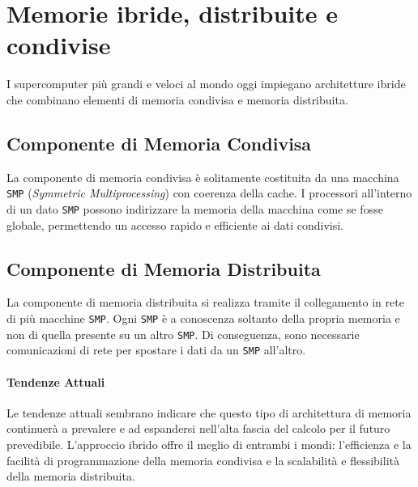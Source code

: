 \section{Memorie ibride, distribuite e condivise}

I supercomputer più grandi e veloci al mondo oggi impiegano architetture ibride che combinano elementi di memoria condivisa e memoria distribuita.

\subsection{Componente di Memoria Condivisa}
La componente di memoria condivisa è solitamente costituita da una macchina
\texttt{SMP} (\textit{Symmetric Multiprocessing}) con coerenza della cache.
I processori all'interno di un dato \texttt{SMP} possono indirizzare la memoria della
macchina come se fosse globale, permettendo un accesso rapido e efficiente ai
dati condivisi.

\subsection{Componente di Memoria Distribuita}
La componente di memoria distribuita si realizza tramite il collegamento
in rete di più macchine \texttt{SMP}. Ogni \texttt{SMP} è a conoscenza soltanto della propria
memoria e non di quella presente su un altro \texttt{SMP}. Di conseguenza, sono necessarie
comunicazioni di rete per spostare i dati da un \texttt{SMP} all'altro.

\paragraph{Tendenze Attuali}
Le tendenze attuali sembrano indicare che questo tipo di architettura di
memoria continuerà a prevalere e ad espandersi nell'alta fascia del calcolo
per il futuro prevedibile. L'approccio ibrido offre il meglio di entrambi i
mondi: l'efficienza e la facilità di programmazione della memoria condivisa
e la scalabilità e flessibilità della memoria distribuita.

